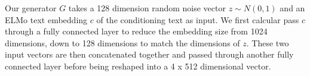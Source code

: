 Our generator $G$ takes a 128 dimension random noise vector $z \sim N(0, 1)$ and an ELMo text embedding $c$ of the conditioning text as input. We first calcular pass $c$ through a fully connected layer to reduce the embedding size from 1024 dimensions, down to 128 dimensions to match the dimensions of $z$. These two input vectors are then concatenated together and passed through another fully connected layer before being reshaped into a 4 x 512 dimensional vector.